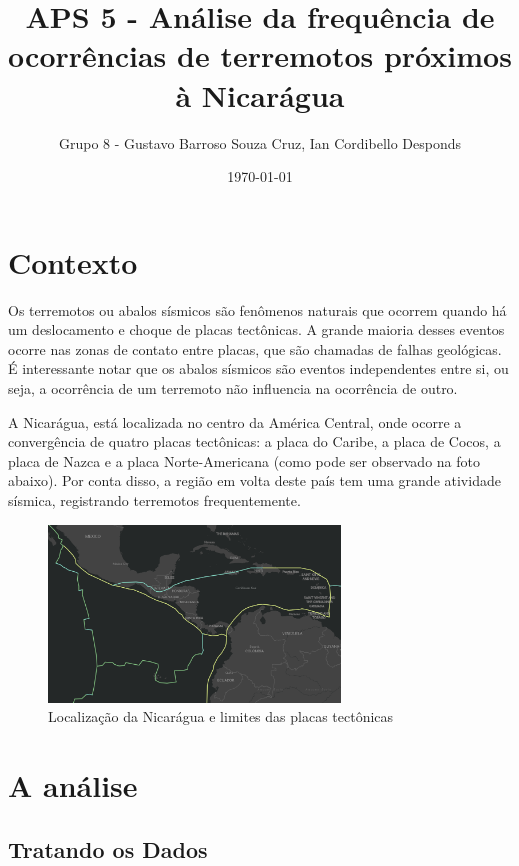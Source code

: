 \documentclass{article}
\title{\textbf{
    APS 5 - Análise da frequência de ocorrências de terremotos próximos à Nicarágua
}}
\author{Grupo 8 - Gustavo Barroso Souza Cruz, Ian Cordibello Desponds}
\date{\today}
\begin{document}
    \maketitle
    \section*{Contexto}
    
    Os terremotos ou abalos sísmicos são fenômenos naturais que ocorrem quando há um deslocamento e choque de placas tectônicas.
    A grande maioria desses eventos ocorre nas zonas de contato entre placas, que são chamadas de falhas geológicas.
    É interessante notar que os abalos sísmicos são eventos independentes entre si, ou seja, a ocorrência de um terremoto 
    não influencia na ocorrência de outro.

    A Nicarágua, está localizada no centro da América Central, onde ocorre a convergência de quatro placas tectônicas: a placa do Caribe,
    a placa de Cocos, a placa de Nazca e a placa Norte-Americana (como pode ser observado na foto abaixo). Por conta disso, a região em 
    volta deste país tem uma grande atividade sísmica, registrando terremotos frequentemente.
    \\

    \begin{figure}[h]
        \centering
        \includegraphics[width=0.69\textwidth]{nicaragua.png}
        \caption{Localização da Nicarágua e limites das placas tectônicas}
        \label{fig:my_label}
    \end{figure}

    \section*{A análise}

    \subsection*{Tratando os Dados}
\end{document}
